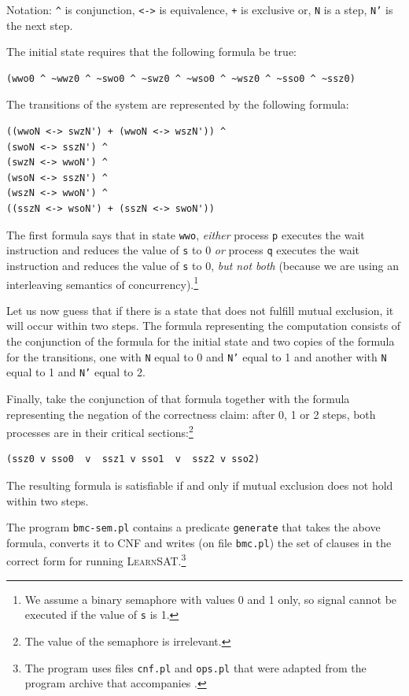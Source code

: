 \documentclass[11pt]{report}
\newcommand*{\p}[1]{\textup{\texttt{#1}}}
\newcommand*{\ls}{\textsc{LearnSAT}}
\begin{document}
Notation: \verb=^= is conjunction, \verb=<->= is equivalence, \verb=+= is
exclusive or, \p{N} is a step, \p{N'} is the next step.

The initial state requires that the following formula be true:
\begin{verbatim}
(wwo0 ^ ~wwz0 ^ ~swo0 ^ ~swz0 ^ ~wso0 ^ ~wsz0 ^ ~sso0 ^ ~ssz0)
\end{verbatim}

The transitions of the system are represented by the following formula:
\begin{verbatim}
((wwoN <-> swzN') + (wwoN <-> wszN')) ^
(swoN <-> sszN') ^
(swzN <-> wwoN') ^
(wsoN <-> sszN') ^
(wszN <-> wwoN') ^
((sszN <-> wsoN') + (sszN <-> swoN'))
\end{verbatim}

The first formula says that in state \p{wwo}, \emph{either} process
\p{p} executes the wait instruction and reduces the value of \p{s} to 0
\emph{or} process \p{q} executes the wait instruction and reduces the
value of \p{s} to 0, \emph{but not both} (because we are using an
interleaving semantics of concurrency).\footnote{We assume a binary
semaphore with values 0 and 1 only, so signal cannot be executed if
the value of \p{s} is 1.}

Let us now guess that if there is a state that does not fulfill mutual
exclusion, it will occur within two steps. The formula representing
the computation consists of the conjunction of the formula for the
initial state and two copies of the formula for the transitions, one
with \p{N} equal to 0 and \p{N'} equal to 1 and another with \p{N} equal
to 1 and \p{N'} equal to 2.

Finally, take the conjunction of that formula together with the formula
representing the negation of the correctness claim: after 0, 1 or 2
steps, both processes are in their critical sections:\footnote{The value
of the semaphore is irrelevant.}

\begin{verbatim}
(ssz0 v sso0  v  ssz1 v sso1  v  ssz2 v sso2)
\end{verbatim}

The resulting formula is satisfiable if and only if mutual exclusion
does not hold within two steps.

The program \p{bmc-sem.pl} contains a predicate \p{generate} that takes
the above formula, converts it to CNF and writes (on file \p{bmc.pl})
the set of clauses in the correct form for running
\ls{}.\footnote{The program uses files \p{cnf.pl} and \p{ops.pl}
that were adapted from the program archive that accompanies
\cite{mlcs}.}
\end{document}
